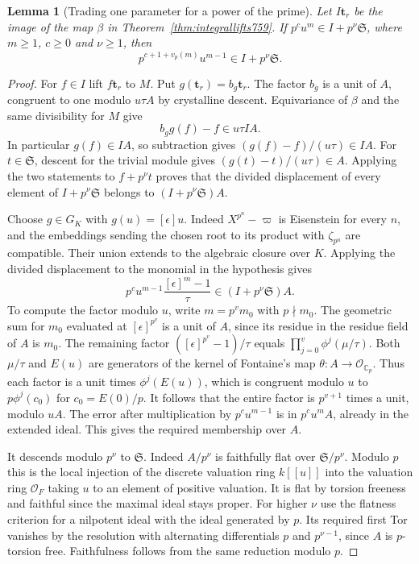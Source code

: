 \documentclass[a4paper,11pt]{article}
\newtheorem{lemma}[proposition]{Lemma}
\theoremstyle{definition}
\theoremstyle{remark}
\numberwithin{equation}{section}
\begin{document}
\begin{lemma}[Trading one parameter for a power of the prime]
\leavevmode\label{lem:kummerlower760}
Let \(I\mathbf t_r\) be the image of the map \(\beta\) in
Theorem~\ref{thm:integrallifts759}. If \(p^c u^m\in I+p^\nu
\mathfrak S\), where \(m\ge1\), \(c\ge0\) and \(\nu\ge1\), then
\[
             p^{c+1+v_p(m)}u^{m-1}\in I+p^\nu\mathfrak S .
\]
\end{lemma}
\begin{proof}
For \(f\in I\) lift \(f\mathbf t_r\) to \(M\). Put
\(g(\mathbf t_r)=b_g\mathbf t_r\). The factor \(b_g\) is a
unit of \(A\), congruent to one modulo \(u\tau A\) by crystalline
descent. Equivariance of \(\beta\) and the same divisibility
for \(M\) give
\[
                     b_g g(f)-f\in u\tau IA.
\]
In particular \(g(f)\in IA\), so subtraction gives
\((g(f)-f)/(u\tau)\in IA\). For \(t\in\mathfrak S\), descent
for the trivial module gives \((g(t)-t)/(u\tau)\in A\).
Applying the two statements to \(f+p^\nu t\) proves that
the divided displacement of every element of \(I+p^\nu\mathfrak S\)
belongs to \((I+p^\nu\mathfrak S)A\).

Choose \(g\in G_K\) with \(g(u)=[\epsilon]u\). Indeed
\(X^{p^n}-\varpi\) is Eisenstein for every \(n\), and the
embeddings sending the chosen root to its product with
\(\zeta_{p^n}\) are compatible. Their union extends to the
algebraic closure over \(K\). Applying the divided displacement
to the monomial in the hypothesis gives
\[
        p^c u^{m-1}\frac{[\epsilon]^m-1}{\tau}
                                  \in (I+p^\nu\mathfrak S)A .
\]
To compute the factor modulo \(u\), write \(m=p^v m_0\) with
\(p\nmid m_0\). The geometric sum for \(m_0\) evaluated at
\([\epsilon]^{p^v}\) is a unit of \(A\), since its residue in
the residue field of \(A\) is \(m_0\). The remaining factor
\(([\epsilon]^{p^v}-1)/\tau\) equals
\(\prod_{j=0}^{v}\phi^j(\mu/\tau)\). Both \(\mu/\tau\) and
\(E(u)\) are generators of the kernel of Fontaine's map
\(\theta:A\to\mathcal O_{\mathbb C_p}\). Thus each factor
is a unit times \(\phi^j(E(u))\), which is congruent modulo
\(u\) to \(p\phi^j(c_0)\) for \(c_0=E(0)/p\). It follows
that the entire factor is \(p^{v+1}\) times a unit, modulo
\(uA\). The error after multiplication by \(p^c u^{m-1}\)
is in \(p^cu^mA\), already in the extended ideal. This gives
the required membership over \(A\).

It descends modulo \(p^\nu\) to \(\mathfrak S\). Indeed
\(A/p^\nu\) is faithfully flat over \(\mathfrak S/p^\nu\).
Modulo \(p\) this is the local injection of the discrete
valuation ring \(k[[u]]\) into the valuation ring \(\mathcal
O_F\) taking \(u\) to an element of positive valuation.
It is flat by torsion freeness and faithful since the maximal
ideal stays proper. For higher \(\nu\) use the flatness
criterion for a nilpotent ideal with the ideal generated by
\(p\). Its required first Tor vanishes by the resolution with
alternating differentials \(p\) and \(p^{\nu-1}\), since
\(A\) is \(p\)-torsion free. Faithfulness follows from the
same reduction modulo \(p\).
\end{proof}
\end{document}
